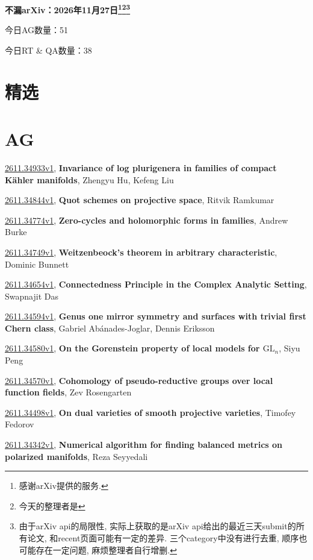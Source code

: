 \documentclass[9pt, a4paper]{article}
\theoremstyle{plain}
\theoremstyle{definition}
\theoremstyle{remark}
\newcommand{\arxiv}[3]{\href{https://arxiv.org/abs/#1}{#1}, \textbf{\textcolor{arxivblue}{#2}}, #3}
\newcommand{\AGnumber}{51}
\newcommand{\RTQAnumber}{38}
\newcommand{\NewestDate}{2026年11月27日}
\newcommand{\todayarXiver}{} %
\begin{document}
\begin{center}
    \Huge\textbf{不漏arXiv：\NewestDate\footnote{感谢arXiv提供的服务.}\footnote{今天的整理者是\todayarXiver}\footnote{由于arXiv api的局限性, 实际上获取的是arXiv api给出的最近三天submit的所有论文, 和recent页面可能有一定的差异. 三个category中没有进行去重, 顺序也可能存在一定问题, 麻烦整理者自行增删.}} \\
\end{center}

\setcounter{section}{-1}

\begin{center}
    今日AG数量：\AGnumber
    
    今日RT \& QA数量：\RTQAnumber
    
\end{center}


\section{精选}


\section{AG}
\arxiv{2611.34933v1}{Invariance of log plurigenera in families of compact Kähler manifolds}{Zhengyu Hu, Kefeng Liu}

\arxiv{2611.34844v1}{Quot schemes on projective space}{Ritvik Ramkumar}

\arxiv{2611.34774v1}{Zero-cycles and holomorphic forms in families}{Andrew Burke}

\arxiv{2611.34749v1}{Weitzenbeock's theorem in arbitrary characteristic}{Dominic Bunnett}

\arxiv{2611.34654v1}{Connectedness Principle in the Complex Analytic Setting}{Swapnajit Das}

\arxiv{2611.34594v1}{Genus one mirror symmetry and surfaces with trivial first Chern class}{Gabriel Abánades-Joglar, Dennis Eriksson}

\arxiv{2611.34580v1}{On the Gorenstein property of local models for $\mathrm{GL}_n$}{Siyu Peng}

\arxiv{2611.34570v1}{Cohomology of pseudo-reductive groups over local function fields}{Zev Rosengarten}

\arxiv{2611.34498v1}{On dual varieties of smooth projective varieties}{Timofey Fedorov}

\arxiv{2611.34342v1}{Numerical algorithm for finding balanced metrics on polarized manifolds}{Reza Seyyedali}
\end{document}
